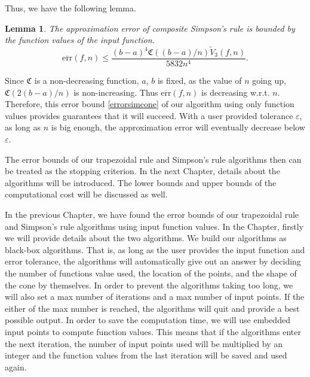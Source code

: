 \documentclass{iitthesis}
\DeclareMathOperator{\Var}{Var}
\newtheorem{lem}{Lemma}
\theoremstyle{definition}
\theoremstyle{remark}
\begin{document}
Thus, we have the following lemma.
\begin{lem}\label{lemmaerrorboundsim}
    The approximation error of composite Simpson's rule is bounded by the function values of the input function.
    \begin{equation}\label{errorsimcone}
      \overline{\text{err}}(f,n)\leq \frac{(b-a)^4\mathfrak{C}((b-a)/n)\widetilde{V}_3(f,n)}{5832n^4}.
    \end{equation}
\end{lem}


Since $\mathfrak{C}$ is a non-decreasing function, $a$, $b$ is fixed, as the value of $n$ going up, $\mathfrak{C}(2(b-a)/n)$ is non-increasing. Thus $\overline{\text{err}}(f,n)$ is decreasing w.r.t. $n$. Therefore, this error bound \eqref{errorsimcone} of our algorithm using only function values provides guarantees that it will succeed. With a user provided tolerance $\varepsilon$, as long as $n$ is big enough, the approximation error will eventually decrease below $\varepsilon$.

The error bounds of our trapezoidal rule and Simpson's rule algorithms then can be treated as the stopping criterion. In the next Chapter, details about the algorithms will be introduced. The lower bounds and upper bounds of the computational cost will be discussed as well.

%




In the previous Chapter, we have found the error bounds of our trapezoidal rule and Simpson's rule algorithms using input function values. In the Chapter, firstly we will provide details about the two algorithms. We build our algorithms as black-box algorithms. That is, as long as the user provides the input function and error tolerance, the algorithms will automatically give out an answer by deciding the number of functions value used, the location of the points, and the shape of the cone by themselves. In order to prevent the algorithms taking too long, we will also set a max number of iterations and a max number of input points. If the either of the max number is reached, the algorithms will quit and provide a best possible output. In order to save the computation time, we will use embedded input points to compute function values. This means that if the algorithms enter the next iteration, the number of input points used will be multiplied by an integer and the function values from the last iteration will be saved and used again.
\end{document}
